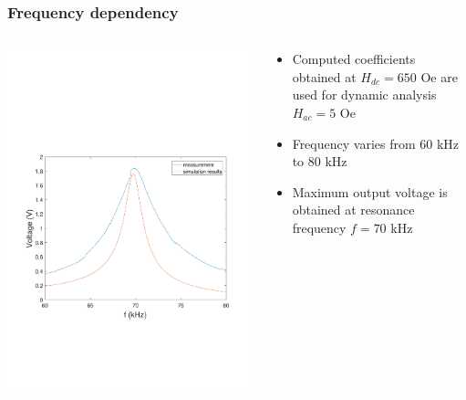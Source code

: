 \documentclass[compress]{beamer}
\begin{document}
\begin{frame}\frametitle{Frequency dependency}
\begin{columns}[totalwidth=\textwidth]
 \begin{column}{.69\textwidth}
 \includegraphics[width=0.99\textwidth]{Graphic/03_volta_dyna_recta.pdf}
 \end{column}
 \begin{column}{.30\textwidth}
 \begin{itemize}[label=$\bullet$, font=\small, leftmargin=*]
 \item Computed coefficients obtained at $H_{dc} = 650$ Oe are used for dynamic analysis $H_{ac} = 5$ Oe
 \item Frequency varies from 60 kHz to 80 kHz
 \item Maximum output voltage is obtained at resonance frequency $f=70$ kHz
 \end{itemize}
 \end{column}
\end{columns}
\end{frame}
\end{document}
